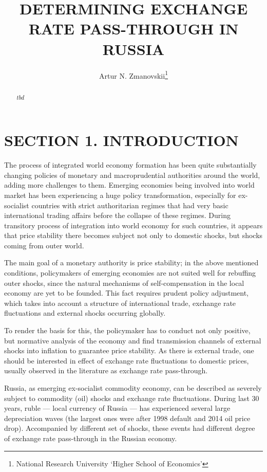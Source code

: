 \documentclass[12pt, a4paper]{extarticle}
\title{{\large DETERMINING EXCHANGE RATE PASS-THROUGH IN RUSSIA}}
\author{Artur N. Zmanovskii\footnote{National Research University `Higher School of Economics'}}
\date{}
\begin{document}
\setcounter{page}{2}
\begin{abstract}
	\textit{tbd}
\end{abstract}
\newpage

\tableofcontents
\linespread{1.5}

\newpage
\linespread{1.5}

\section*{SECTION 1. INTRODUCTION}

The process of integrated world economy formation has been quite substantially changing policies of monetary and macroprudential authorities around the world, adding more challenges to them. Emerging economies being involved into world market has been experiencing a huge policy transformation, especially for ex-socialist countries with strict authoritarian regimes that had very basic international trading affairs before the collapse of these regimes. During transitory process of integration into world economy for such countries, it appears that price stability there becomes subject not only to domestic shocks, but shocks coming from outer world.

The main goal of a monetary authority is price stability; in the above mentioned conditions, policymakers of emerging economies are not suited well for rebuffing outer shocks, since the natural mechanisms of self-compensation in the local economy are yet to be founded. This fact requires prudent policy adjustment, which takes into account a structure of international trade, exchange rate fluctuations and external shocks occurring globally. 

To render the basis for this, the policymaker has to conduct not only positive, but normative analysis of the economy and find transmission channels of external shocks into inflation to guarantee price stability. As there is external trade, one should be interested in effect of exchange rate fluctuations to domestic prices, usually observed in the literature as exchange rate pass-through.

Russia, as emerging ex-socialist commodity economy, can be described as severely subject to commodity (oil) shocks and exchange rate fluctuations. During last 30 years, ruble --- local currency of Russia --- has experienced several large depreciation waves (the largest ones were after 1998 default and 2014 oil price drop). Accompanied by different set of shocks, these events had different degree of exchange rate pass-through in the Russian economy. 
\end{document}
